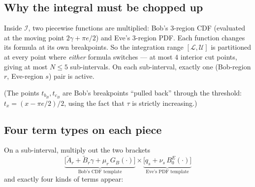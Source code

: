 \documentclass[11pt]{article}
\begin{document}
\subsection{Why the integral must be chopped up}

Inside $\mathcal I$, two piecewise functions are multiplied: Bob's 3-region CDF
(evaluated at the moving point $2\gamma + \pi e/2$) and Eve's 3-region PDF. Each
function changes its formula at its own breakpoints. So the integration range
$[\mathcal L,\mathcal U]$ is partitioned at every point where \emph{either} formula
switches --- at most $4$ interior cut points, giving at most $N\le 5$ sub-intervals.
On each sub-interval, exactly one (Bob-region $r$, Eve-region $s$) pair is active.

\begin{center}
\end{center}

(The points $t_{b_B}, t_{c_B}$ are Bob's breakpoints ``pulled back'' through the
threshold: $t_x = (x-\pi e/2)/2$, using the fact that $\tau$ is strictly increasing.)

\subsection{Four term types on each piece}

On a sub-interval, multiply out the two brackets
\[
\underbrace{\Big[\tilde A_r+\tilde B_r\gamma+\mu_r\, G_B(\cdot)\Big]}_{\text{Bob's CDF template}}
\times
\underbrace{\Big[q_s+\nu_s\, B_0^{E}(\cdot)\Big]}_{\text{Eve's PDF template}}
\]
and exactly four kinds of terms appear:
\end{document}
